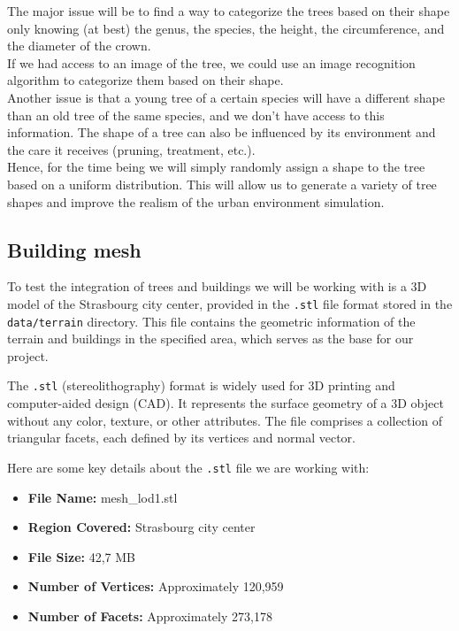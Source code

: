 \documentclass[12pt]{article}
\begin{document}
The major issue will be to find a way to categorize the trees based on their shape
only knowing (at best) the genus, the species, the height, the circumference, and
the diameter of the crown. \\
If we had access to an image of the tree, we could use an image recognition
algorithm to categorize them based on their shape. \\
Another issue is that a young tree of a certain species will have a different 
shape than an old tree of the same species, and we don't have access to this information.
 The shape of a tree can also be influenced by its environment and the care it 
 receives (pruning, treatment, etc.). \\

 Hence, for the time being we will simply randomly assign a shape to the tree
 based on a uniform distribution. This will allow us to generate a variety of
 tree shapes and improve the realism of the urban environment simulation.
\subsection{Building mesh}

To test the integration of trees and buildings we will be working with is a 3D 
model of the Strasbourg city
center, provided in the \texttt{.stl} file format stored in the \texttt{data/terrain}
directory. This file contains the
geometric information of the terrain and buildings in the specified area,
which serves as the base for our project.

The \texttt{.stl}\cite{stl} (stereolithography) format is widely used for 3D printing
and computer-aided design (CAD). It represents the surface geometry of a 3D
object without any color, texture, or other attributes. The file comprises a
collection of triangular facets, each defined by its vertices and normal vector.

Here are some key details about the \texttt{.stl} file we are working with:
\begin{itemize}
    \item \textbf{File Name:} mesh\_lod1.stl
    \item \textbf{Region Covered:} Strasbourg city center
    \item \textbf{File Size:} 42,7 MB
    \item \textbf{Number of Vertices:} Approximately 120,959
    \item \textbf{Number of Facets:} Approximately 273,178
\end{itemize}
\end{document}
